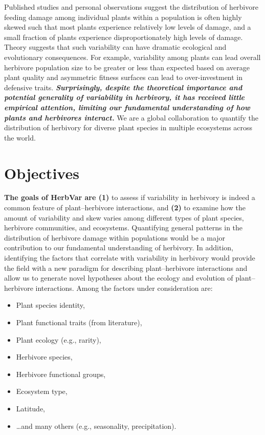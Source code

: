 \documentclass[
  letterpaper,
  DIV=11,
  numbers=noendperiod]{scrreprt}
\providecommand{\tightlist}{%
  \setlength{\itemsep}{0pt}\setlength{\parskip}{0pt}}\usepackage{longtable,booktabs,array}
\begin{document}
Published studies and personal observations suggest the distribution of
herbivore feeding damage among individual plants within a population is
often highly skewed such that most plants experience relatively low
levels of damage, and a small fraction of plants experience
disproportionately high levels of damage. Theory suggests that such
variability can have dramatic ecological and evolutionary consequences.
For example, variability among plants can lead overall herbivore
population size to be greater or less than expected based on average
plant quality and asymmetric fitness surfaces can lead to
over-investment in defensive traits. \textbf{\emph{Surprisingly, despite
the theoretical importance and potential generality of variability in
herbivory, it has received little empirical attention, limiting our
fundamental understanding of how plants and herbivores interact.}} We
are a global collaboration to quantify the distribution of herbivory for
diverse plant species in multiple ecosystems across the world.

\section{Objectives}\label{objectives}

\textbf{The goals of HerbVar are (1)} to assess if variability in
herbivory is indeed a common feature of plant--herbivore interactions,
and \textbf{(2)} to examine how the amount of variability and skew
varies among different types of plant species, herbivore communities,
and ecosystems. Quantifying general patterns in the distribution of
herbivore damage within populations would be a major contribution to our
fundamental understanding of herbivory. In addition, identifying the
factors that correlate with variability in herbivory would provide the
field with a new paradigm for describing plant--herbivore interactions
and allow us to generate novel hypotheses about the ecology and
evolution of plant--herbivore interactions. Among the factors under
consideration are:

\begin{itemize}
\tightlist
\item
  Plant species identity,
\item
  Plant functional traits (from literature),
\item
  Plant ecology (e.g., rarity),
\item
  Herbivore species,
\item
  Herbivore functional groups,
\item
  Ecosystem type,
\item
  Latitude,
\item
  \ldots and many others (e.g., seasonality, precipitation).
\end{itemize}
\end{document}

